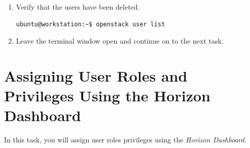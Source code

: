 \documentclass[letterpaper, 12pt]{article}
\begin{document}
\begin{enumerate}
    \item Verify that the users have been deleted.
\begin{lstlisting}
ubuntu@workstation:~$ openstack user list
\end{lstlisting}

    \item Leave the terminal window open and continue on to the next task.
\end{enumerate}

\section{Assigning User Roles and Privileges Using the Horizon Dashboard}
\label{sec:assigning_user_roles_and_privileges_using_the_horizon_dashboard}
In this task, you will assign user roles privileges using the \textit{Horizon Dashboard}.
\end{document}
